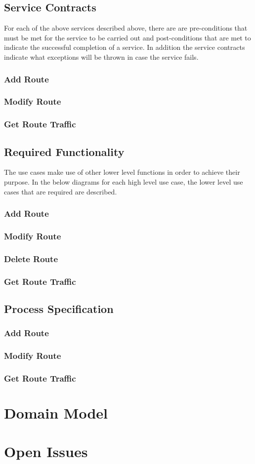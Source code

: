 \documentclass[a4paper,12pt]{article}
\begin{document}
\subsection{Service Contracts}
For each of the above services described above, there are are pre-conditions that must be met for the service to be carried out and post-conditions that are met to indicate the successful completion of a service. In addition the service contracts indicate what exceptions will be thrown in case the service fails.

\subsubsection{Add Route}
\subsubsection{Modify Route} 
\subsubsection{Get Route Traffic}

\subsection{Required Functionality}
The use cases make use of other lower level functions in order to achieve their purpose. In the below diagrams for each high level use case, the lower level use cases that are required are described.
 
\subsubsection{Add Route}
\subsubsection{Modify Route} 
\subsubsection{Delete Route}
\subsubsection{Get Route Traffic}

\subsection{Process Specification}

\subsubsection{Add Route}
\subsubsection{Modify Route} 
\subsubsection{Get Route Traffic}

\section{Domain Model}


\section{Open Issues}
\end{document}
